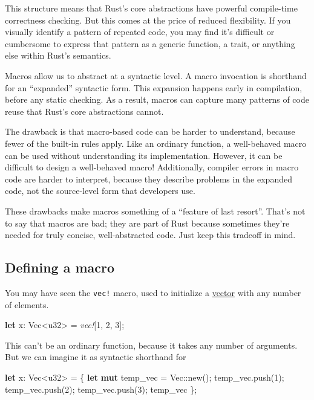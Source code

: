 \documentclass[a4paper,]{book}
\newenvironment{Shaded}{\begin{snugshade}}{\end{snugshade}}
\newcommand{\KeywordTok}[1]{\textcolor[rgb]{0.13,0.29,0.53}{\textbf{{#1}}}}
\newcommand{\DataTypeTok}[1]{\textcolor[rgb]{0.13,0.29,0.53}{{#1}}}
\newcommand{\DecValTok}[1]{\textcolor[rgb]{0.00,0.00,0.81}{{#1}}}
\newcommand{\PreprocessorTok}[1]{\textcolor[rgb]{0.56,0.35,0.01}{\textit{{#1}}}}
\newcommand{\NormalTok}[1]{{#1}}
\begin{document}
This structure means that Rust's core abstractions have powerful
compile-time correctness checking. But this comes at the price of
reduced flexibility. If you visually identify a pattern of repeated
code, you may find it's difficult or cumbersome to express that pattern
as a generic function, a trait, or anything else within Rust's
semantics.

Macros allow us to abstract at a syntactic level. A macro invocation is
shorthand for an ``expanded'' syntactic form. This expansion happens
early in compilation, before any static checking. As a result, macros
can capture many patterns of code reuse that Rust's core abstractions
cannot.

The drawback is that macro-based code can be harder to understand,
because fewer of the built-in rules apply. Like an ordinary function, a
well-behaved macro can be used without understanding its implementation.
However, it can be difficult to design a well-behaved macro!
Additionally, compiler errors in macro code are harder to interpret,
because they describe problems in the expanded code, not the
source-level form that developers use.

These drawbacks make macros something of a ``feature of last resort''.
That's not to say that macros are bad; they are part of Rust because
sometimes they're needed for truly concise, well-abstracted code. Just
keep this tradeoff in mind.

\subsection{Defining a macro}\label{defining-a-macro}

You may have seen the \texttt{vec!} macro, used to initialize a
\protect\hyperlink{sec--vectors}{vector} with any number of elements.

\begin{Shaded}
\begin{Highlighting}[]
\KeywordTok{let} \NormalTok{x: }\DataTypeTok{Vec}\NormalTok{<}\DataTypeTok{u32}\NormalTok{> = }\PreprocessorTok{vec!}\NormalTok{[}\DecValTok{1}\NormalTok{, }\DecValTok{2}\NormalTok{, }\DecValTok{3}\NormalTok{];}
\end{Highlighting}
\end{Shaded}

This can't be an ordinary function, because it takes any number of
arguments. But we can imagine it as syntactic shorthand for

\begin{Shaded}
\begin{Highlighting}[]
\KeywordTok{let} \NormalTok{x: }\DataTypeTok{Vec}\NormalTok{<}\DataTypeTok{u32}\NormalTok{> = \{}
    \KeywordTok{let} \KeywordTok{mut} \NormalTok{temp_vec = }\DataTypeTok{Vec}\NormalTok{::new();}
    \NormalTok{temp_vec.push(}\DecValTok{1}\NormalTok{);}
    \NormalTok{temp_vec.push(}\DecValTok{2}\NormalTok{);}
    \NormalTok{temp_vec.push(}\DecValTok{3}\NormalTok{);}
    \NormalTok{temp_vec}
\NormalTok{\};}
\end{Highlighting}
\end{Shaded}
\end{document}
